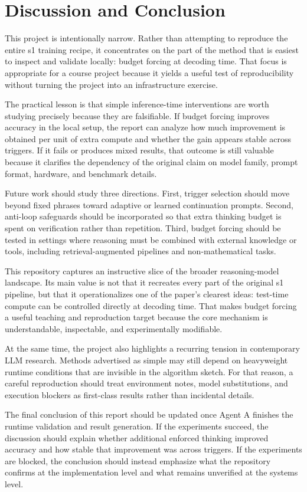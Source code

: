 \section{Discussion and Conclusion}\label{sec:conclusion}

This project is intentionally narrow. Rather than attempting to reproduce the entire s1 training recipe, it concentrates on the part of the method that is easiest to inspect and validate locally: budget forcing at decoding time. That focus is appropriate for a course project because it yields a useful test of reproducibility without turning the project into an infrastructure exercise.

The practical lesson is that simple inference-time interventions are worth studying precisely because they are falsifiable. If budget forcing improves accuracy in the local setup, the report can analyze how much improvement is obtained per unit of extra compute and whether the gain appears stable across triggers. If it fails or produces mixed results, that outcome is still valuable because it clarifies the dependency of the original claim on model family, prompt format, hardware, and benchmark details.

Future work should study three directions. First, trigger selection should move beyond fixed phrases toward adaptive or learned continuation prompts. Second, anti-loop safeguards should be incorporated so that extra thinking budget is spent on verification rather than repetition. Third, budget forcing should be tested in settings where reasoning must be combined with external knowledge or tools, including retrieval-augmented pipelines and non-mathematical tasks.
\label{sec:conclusion}

This repository captures an instructive slice of the broader reasoning-model landscape. Its main value is not that it recreates every part of the original s1 pipeline, but that it operationalizes one of the paper's clearest ideas: test-time compute can be controlled directly at decoding time. That makes budget forcing a useful teaching and reproduction target because the core mechanism is understandable, inspectable, and experimentally modifiable.

At the same time, the project also highlights a recurring tension in contemporary LLM research. Methods advertised as simple may still depend on heavyweight runtime conditions that are invisible in the algorithm sketch. For that reason, a careful reproduction should treat environment notes, model substitutions, and execution blockers as first-class results rather than incidental details.

The final conclusion of this report should be updated once Agent A finishes the runtime validation and result generation. If the experiments succeed, the discussion should explain whether additional enforced thinking improved accuracy and how stable that improvement was across triggers. If the experiments are blocked, the conclusion should instead emphasize what the repository confirms at the implementation level and what remains unverified at the systems level.